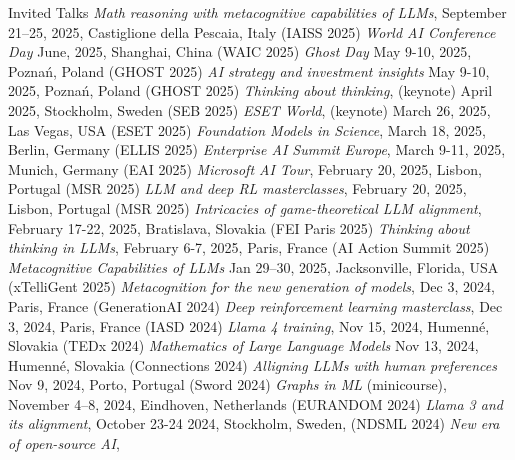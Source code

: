 \documentclass{resume}
\begin{document}
\begin{category}{Invited Talks}
	\citembullet
	\emph{Math reasoning with metacognitive capabilities of LLMs}, 
         September 21--25, 2025, Castiglione della Pescaia, Italy
	 ({\sf IAISS 2025})	 
	 \citembullet
	\emph{World AI Conference Day} 
         June, 2025, Shanghai, China
	 ({\sf WAIC 2025})	
	 	 \citembullet
 	\emph{Ghost Day} 
         May 9-10, 2025, Poznań, Poland
	 ({\sf GHOST 2025})	
	  \citembullet
 	\emph{AI strategy and investment insights} 
         May 9-10, 2025, Poznań, Poland
	 ({\sf GHOST 2025})	
	\citembullet
	\emph{Thinking about thinking}, (keynote)
         April 2025, Stockholm, Sweden
	 ({\sf SEB 2025})	  	 
	\citembullet
	\emph{ESET World}, (keynote)
        March 26, 2025, Las Vegas, USA 
	 ({\sf ESET 2025})	 
	\citembullet	 
	\emph{Foundation Models in Science}, 
        March 18, 2025, Berlin, Germany 
	 ({\sf ELLIS 2025})	 	 
	\citembullet
	\emph{Enterprise AI Summit Europe}, 
        March 9-11, 2025, Munich, Germany 
	 ({\sf EAI 2025})	 	 
	\citembullet
	\emph{Microsoft AI Tour},
	 February 20, 2025, Lisbon, Portugal 
	 ({\sf MSR 2025})	 	 	 
	\citembullet
	\emph{LLM and deep RL masterclasses},
	 February 20, 2025, Lisbon, Portugal 
	 ({\sf MSR 2025})	 	 	  
	\citembullet
	\emph{Intricacies of game-theoretical LLM alignment},
        February 17-22, 2025, Bratislava, Slovakia
	 ({\sf FEI Paris 2025})	 
	\citembullet
	\emph{Thinking about thinking in LLMs},
         February 6-7, 2025, Paris, France 
	 ({\sf AI Action Summit 2025})	
	\citembullet
	 \emph{Metacognitive Capabilities of LLMs}
        Jan 29--30, 2025, Jacksonville, Florida, USA
	 ({\sf xTelliGent 2025}) 	 
	 \citembullet
	\emph{Metacognition for the new generation of models},
         Dec 3, 2024, Paris, France 
	 ({\sf  GenerationAI 2024})	
         \citembullet
	\emph{Deep reinforcement learning masterclass},
         Dec 3, 2024, Paris, France 
	 ({\sf  IASD 2024})	
	 \citembullet
	\emph{Llama 4 training},
         Nov  15, 2024, Humenné, Slovakia 
	({\sf  TEDx 2024})	
	\citembullet
	\emph{Mathematics of Large Language Models}
         Nov  13, 2024, Humenné, Slovakia 
	({\sf  Connections 2024})	
	\citembullet
	\emph{Alligning LLMs with human preferences}
         Nov  9, 2024,  Porto, Portugal
	({\sf   Sword  2024})	
	\citembullet
	\emph{Graphs in ML} (minicourse),
         November 4--8, 2024, Eindhoven, Netherlands 
	 ({\sf EURANDOM 2024})	 
	\citembullet
	\emph{Llama 3 and its alignment},
        October 23-24  2024, Stockholm, Sweden, 
	 ({\sf NDSML 2024})
	\citembullet
	\emph{New era of open-source AI},

\end{category}
\end{document}
